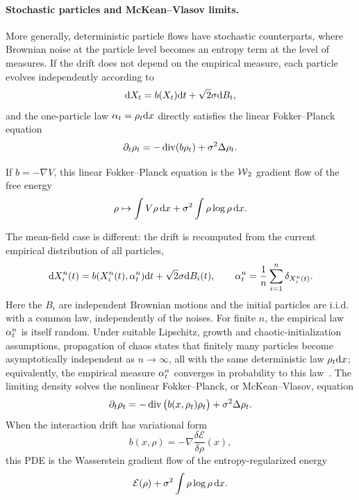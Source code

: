 \paragraph{Stochastic particles and McKean--Vlasov limits.}
More generally, deterministic particle flows have stochastic counterparts, where Brownian noise at the particle level becomes an entropy term at the level of measures. If the drift does not depend on the empirical measure, each particle evolves independently according to
\[
	\mathrm{d} X_t=b(X_t)\mathrm{d} t+\sqrt{2}\sigma\mathrm{d} B_t,
\]
and the one-particle law $\alpha_t=\rho_t\mathrm{d} x$ directly satisfies the linear Fokker--Planck equation
\[
	\partial_t\rho_t=-\operatorname{div}(b\rho_t)+\sigma^2\Delta\rho_t.
\]

\begin{example}
	If $b=-\nabla V$, this linear Fokker--Planck equation is the $\operatorname{\mathcal{W}}_2$ gradient flow of the free energy
	\[
		\rho\mapsto \int V\rho\,\mathrm{d} x+\sigma^2\int\rho\log\rho\,\mathrm{d} x.
	\]
\end{example}

The mean-field case is different: the drift is recomputed from the current empirical distribution of all particles,
\[
	\mathrm{d} X_i^n(t)=b(X_i^n(t),\alpha_t^n)\mathrm{d} t+\sqrt{2}\sigma\mathrm{d} B_i(t),
	\qquad
	\alpha_t^n=\frac1n\sum_{i=1}^n\delta_{X_i^n(t)}.
\]
Here the $B_i$ are independent Brownian motions and the initial particles are i.i.d. with a common law, independently of the noises. For finite $n$, the empirical law $\alpha_t^n$ is itself random. Under suitable Lipschitz, growth and chaotic-initialization assumptions, propagation of chaos states that finitely many particles become asymptotically independent as $n\to\infty$, all with the same deterministic law $\rho_t\mathrm{d} x$; equivalently, the empirical measure $\alpha_t^n$ converges in probability to this law~\cite{ChaintronDiez2022ChaosI,ChaintronDiez2022ChaosII}. The limiting density solves the nonlinear Fokker--Planck, or McKean--Vlasov, equation
\[
	\partial_t \rho_t
	=
	-\operatorname{div}\big(b(x,\rho_t)\rho_t\big)
	+
	\sigma^2\Delta\rho_t.
\]
When the interaction drift has variational form
\[
	b(x,\rho)=-\nabla \frac{\delta \mathcal E}{\delta \rho}(x),
\]
	this PDE is the Wasserstein gradient flow of the entropy-regularized energy
	\[
		\mathcal E(\rho)+\sigma^2\int \rho\log\rho\,\mathrm{d} x.
	\]


